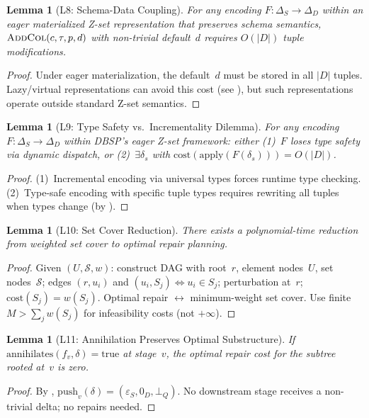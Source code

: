 \documentclass[11pt,a4paper]{article}
\newtheorem{lemma}[theorem]{Lemma}
\theoremstyle{definition}
\newcommand{\DeltaS}{\Delta_{\!S}}
\newcommand{\DeltaD}{\Delta_{\!D}}
\newcommand{\epsS}{\varepsilon_S}
\newcommand{\zeroD}{0_D}
\newcommand{\botQ}{\bot_Q}
\newcommand{\push}{\mathrm{push}}
\newcommand{\ann}{\mathrm{annihilates}}
\newcommand{\cost}{\mathrm{cost}}
\begin{document}
\begin{lemma}[L8: Schema-Data Coupling]\label{lem:schema-data-coupling}
For any encoding $F\colon \DeltaS \to \DeltaD$ within an eager materialized
Z-set representation that preserves schema semantics,
$\textsc{AddCol}(c, \tau, p, d)$ with non-trivial default~$d$ requires
$O(|D|)$ tuple modifications.
\end{lemma}
\begin{proof}
Under eager materialization, the default~$d$ must be stored in all $|D|$ tuples.
Lazy/virtual representations can avoid this cost (see ),
but such representations operate outside standard Z-set semantics.
\end{proof}

\begin{lemma}[L9: Type Safety vs.\ Incrementality Dilemma]\label{lem:type-inc}
For any encoding $F\colon \DeltaS \to \DeltaD$ within DBSP's eager Z-set
framework: either (1)~$F$ loses type safety via dynamic dispatch, or
(2)~$\exists \delta_s$ with $\cost(\mathrm{apply}(F(\delta_s))) = O(|D|)$.
\end{lemma}
\begin{proof}
(1)~Incremental encoding via universal types forces runtime type checking.
(2)~Type-safe encoding with specific tuple types requires rewriting all tuples
when types change (by ).
\end{proof}

\begin{lemma}[L10: Set Cover Reduction]\label{lem:set-cover}
There exists a polynomial-time reduction from weighted set cover to optimal
repair planning.
\end{lemma}
\begin{proof}
Given $(U, \mathcal{S}, w)$: construct DAG with root~$r$, element nodes~$U$,
set nodes~$\mathcal{S}$; edges $(r, u_i)$ and $(u_i, S_j) \iff u_i \in S_j$;
perturbation at~$r$; $\cost(S_j) = w(S_j)$.
Optimal repair $\leftrightarrow$ minimum-weight set cover.
Use finite $M > \sum_j w(S_j)$ for infeasibility costs (not $+\infty$).
\end{proof}

\begin{lemma}[L11: Annihilation Preserves Optimal Substructure]\label{lem:ann-opt}
If $\ann(f_v, \delta) = \mathrm{true}$ at stage~$v$, the optimal repair cost
for the subtree rooted at~$v$ is zero.
\end{lemma}
\begin{proof}
By , $\push_v(\delta) = (\epsS, \zeroD, \botQ)$.
No downstream stage receives a non-trivial delta; no repairs needed.
\end{proof}
\end{document}
